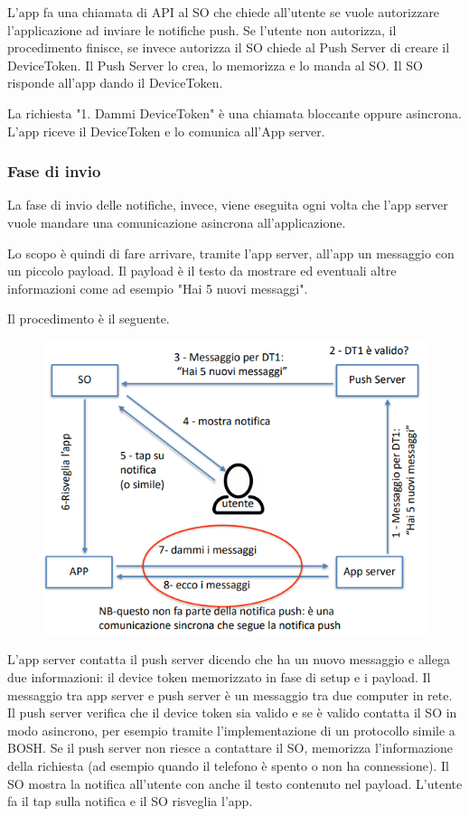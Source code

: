 L'app fa una chiamata di API al SO che chiede all'utente se vuole autorizzare l'applicazione ad inviare le notifiche push. Se l'utente non autorizza, il procedimento finisce, se invece autorizza il SO chiede al Push Server di creare il DeviceToken. 
Il Push Server lo crea, lo memorizza e lo manda al SO. 
Il SO risponde all'app dando il DeviceToken. 

La richiesta "1. Dammi DeviceToken" è una chiamata bloccante oppure asincrona. 
L'app riceve il DeviceToken e lo comunica all'App server. 


\subsubsection{Fase di invio}
La fase di invio delle notifiche, invece, viene eseguita ogni volta che l’app server vuole mandare una comunicazione asincrona all’applicazione. 

Lo scopo è quindi di fare arrivare, tramite l'app server, all'app un messaggio con un piccolo payload. Il payload è il testo da mostrare ed eventuali altre informazioni come ad esempio "Hai 5 nuovi messaggi".

Il procedimento è il seguente. 
\begin{figure}[!ht]
    \centering
    \includegraphics[width=.65\textwidth]{images/Mobile computing/3. Reti e architetture/invio.PNG}
\end{figure}

L'app server contatta il push server dicendo che ha un nuovo messaggio e allega due informazioni: il device token memorizzato in fase di setup e i payload. Il messaggio tra app server e push server è un messaggio tra due computer in rete. 
Il push server verifica che il device token sia valido e se è valido contatta il SO in modo asincrono, per esempio tramite l'implementazione di un protocollo simile a BOSH. Se il push server non riesce a contattare il SO, memorizza l'informazione della richiesta (ad esempio quando il telefono è spento o non ha connessione). 
Il SO mostra la notifica all'utente con anche il testo contenuto nel payload. L'utente fa il tap sulla notifica e il SO risveglia l'app.

